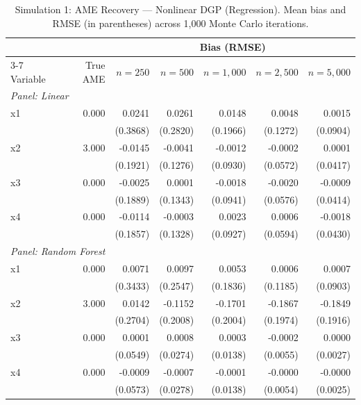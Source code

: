 \documentclass[12pt]{article}
\begin{document}
	\begin{table}[htbp]
		\centering
		\small
		\begin{threeparttable}
			\caption{Simulation 1: AME Recovery --- Nonlinear DGP (Regression). Mean bias and RMSE (in parentheses) across 1,000 Monte Carlo iterations.}
			\label{tab:sim1_regression_nonlinear}
			\begin{tabular}{lrrrrrr}
				\toprule
				& & \multicolumn{5}{c}{Bias (RMSE)} \\
				\cmidrule(lr){3-7}
				Variable & True AME & $n=250$ & $n=500$ & $n=1,000$ & $n=2,500$ & $n=5,000$ \\
				\midrule
				\multicolumn{7}{l}{\textit{Panel: Linear}} \\
				\quad x1 & 0.000 & 0.0241 & 0.0261 & 0.0148 & 0.0048 & 0.0015 \\
				&  & (0.3868) & (0.2820) & (0.1966) & (0.1272) & (0.0904) \\
				\quad x2 & 3.000 & -0.0145 & -0.0041 & -0.0012 & -0.0002 & 0.0001 \\
				&  & (0.1921) & (0.1276) & (0.0930) & (0.0572) & (0.0417) \\
				\quad x3 & 0.000 & -0.0025 & 0.0001 & -0.0018 & -0.0020 & -0.0009 \\
				&  & (0.1889) & (0.1343) & (0.0941) & (0.0576) & (0.0414) \\
				\quad x4 & 0.000 & -0.0114 & -0.0003 & 0.0023 & 0.0006 & -0.0018 \\
				&  & (0.1857) & (0.1328) & (0.0927) & (0.0594) & (0.0430) \\
				\midrule
				\multicolumn{7}{l}{\textit{Panel: Random Forest}} \\
				\quad x1 & 0.000 & 0.0071 & 0.0097 & 0.0053 & 0.0006 & 0.0007 \\
				&  & (0.3433) & (0.2547) & (0.1836) & (0.1185) & (0.0903) \\
				\quad x2 & 3.000 & 0.0142 & -0.1152 & -0.1701 & -0.1867 & -0.1849 \\
				&  & (0.2704) & (0.2008) & (0.2004) & (0.1974) & (0.1916) \\
				\quad x3 & 0.000 & 0.0001 & 0.0008 & 0.0003 & -0.0002 & 0.0000 \\
				&  & (0.0549) & (0.0274) & (0.0138) & (0.0055) & (0.0027) \\
				\quad x4 & 0.000 & -0.0009 & -0.0007 & -0.0001 & -0.0000 & -0.0000 \\
				&  & (0.0573) & (0.0278) & (0.0138) & (0.0054) & (0.0025) \\
				\midrule

\end{tabular}
\end{threeparttable}
\end{table}
\end{document}
